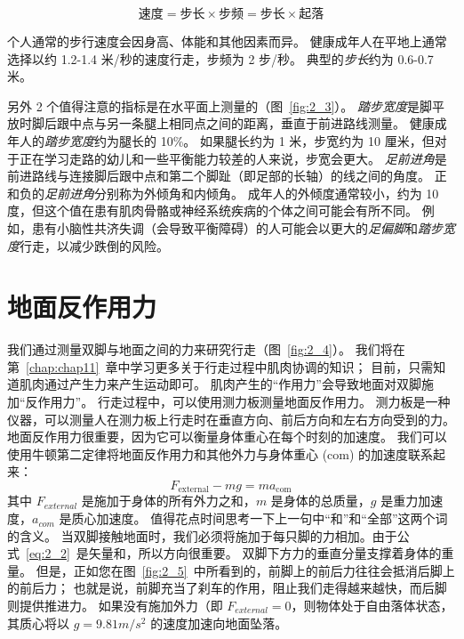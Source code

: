 \begin{equation}
	\text{速度} = \text{步长} \times \text{步频}
			    = \text{步长} \times \text{起落}
\end{equation}

个人通常的步行速度会因身高、体能和其他因素而异。
健康成年人在平地上通常选择以约 1.2-1.4 米/秒的速度行走，步频为 2 步/秒。
典型的\textit{步长}约为 0.6-0.7 米。


另外 2 个值得注意的指标是在水平面上测量的（图~\ref{fig:2_3}）。
\textit{踏步宽度}是脚平放时脚后跟中点与另一条腿上相同点之间的距离，垂直于前进路线测量。
健康成年人的\textit{踏步宽度}约为腿长的 10\%。
如果腿长约为 1 米，步宽约为 10 厘米，但对于正在学习走路的幼儿和一些平衡能力较差的人来说，步宽会更大。
\textit{足前进角}是前进路线与连接脚后跟中点和第二个脚趾（即足部的长轴）的线之间的角度。
正和负的\textit{足前进角}分别称为外倾角和内倾角。
成年人的外倾度通常较小，约为 10 度，但这个值在患有肌肉骨骼或神经系统疾病的个体之间可能会有所不同。
例如，患有小脑性共济失调（会导致平衡障碍）的人可能会以更大的\textit{足偏脚}和\textit{踏步宽度}行走，以减少跌倒的风险。


\section{地面反作用力}

我们通过测量双脚与地面之间的力来研究行走（图~\ref{fig:2_4}）。
我们将在第~\ref{chap:chap11}~章中学习更多关于行走过程中肌肉协调的知识；
目前，只需知道肌肉通过产生力来产生运动即可。
肌肉产生的“作用力”会导致地面对双脚施加“反作用力”。
行走过程中，可以使用测力板测量地面反作用力。
测力板是一种仪器，可以测量人在测力板上行走时在垂直方向、前后方向和左右方向受到的力。​​
地面反作用力很重要，因为它可以衡量身体重心在每个时刻的加速度。
我们可以使用牛顿第二定律将地面反作用力和其他外力与身体重心 (com) 的加速度联系起来：
\begin{equation}
	F_{\text{external}} - mg = m a_{\text{com}} \label{eq:2_2}
\end{equation}
其中 $F_{external}$ 是施加于身体的所有外力之和，$m$ 是身体的总质量，$g$ 是重力加速度，$a_{com}$ 是质心加速度。
值得花点时间思考一下上一句中“和”和“全部”这两个词的含义。
当双脚接触地面时，我们必须将施加于每只脚的力相加。由于公式~\ref{eq:2_2}~是矢量和，所以方向很重要。
双脚下方力的垂直分量支撑着身体的重量。
但是，正如您在图~\ref{fig:2_5}~中所看到的，前脚上的前后力往往会抵消后脚上的前后力；
也就是说，前脚充当了刹车的作用，阻止我们走得越来越快，而后脚则提供推进力。
如果没有施加外力（即 $F_{external} = 0$，则物体处于自由落体状态，其质心将以 $g = 9.81 m/s^2$ 的速度加速向地面坠落。



